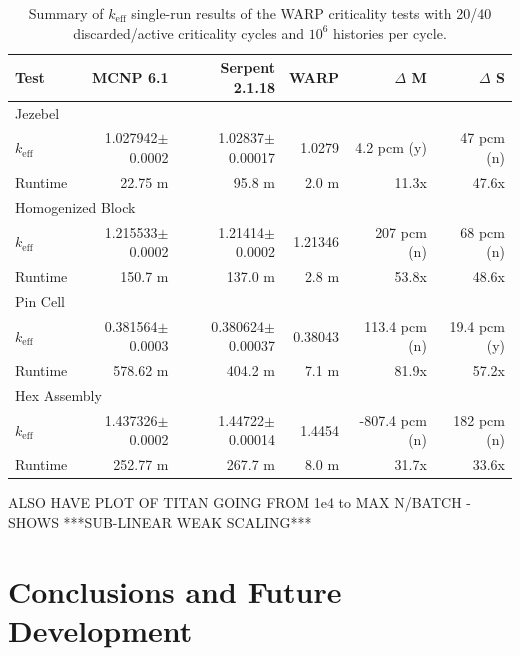 \documentclass[preprint,12pt]{elsarticle}
\begin{document}
\begin{table}[h]
\centering
\caption{Summary of $k_\mathrm{eff}$ single-run results of the WARP criticality tests with 20/40 discarded/active criticality cycles and $10^6$ histories per cycle.}
\label{test_summary_6}
\small
\begin{tabular}{| l | r | r | r | r | r |}
\hline
Test & MCNP 6.1 & Serpent 2.1.18 & WARP & $\Delta$ M & $\Delta$ S \\
\hline
\hline
\multicolumn{6}{|l|}{Jezebel} \\
\hline
$k_\mathrm{eff}$ & 1.027942$\pm$0.0002 & 1.02837$\pm$0.00017 & 1.0279 & 4.2 pcm (y) & 47 pcm (n) \\
\hline
Runtime & 22.75 m & 95.8 m & 2.0 m & 11.3x & 47.6x \\
\hline
\hline
\multicolumn{6}{|l|}{Homogenized Block }\\
\hline
$k_\mathrm{eff}$ & 1.215533$\pm$0.0002 & 1.21414$\pm$0.0002 & 1.21346 & 207 pcm (n) & 68 pcm (n) \\
\hline
Runtime & 150.7 m & 137.0 m & 2.8 m & 53.8x & 48.6x \\
\hline
\hline
\multicolumn{6}{|l|}{Pin Cell}\\
\hline
$k_\mathrm{eff}$ & 0.381564$\pm$0.0003 & 0.380624$\pm$0.00037 & 0.38043 & 113.4 pcm (n) & 19.4 pcm (y) \\
\hline
Runtime & 578.62 m & 404.2 m & 7.1 m & 81.9x & 57.2x \\
\hline
\hline
\multicolumn{6}{|l|}{Hex Assembly}\\
\hline
$k_\mathrm{eff}$ & 1.437326$\pm$0.0002 & 1.44722$\pm$0.00014 & 1.4454 & -807.4 pcm (n) & 182 pcm (n) \\
\hline
Runtime & 252.77 m & 267.7 m & 8.0 m & 31.7x & 33.6x \\
\hline
\end{tabular}
\end{table}


ALSO HAVE PLOT OF TITAN GOING FROM 1e4 to MAX N/BATCH - SHOWS ***SUB-LINEAR WEAK SCALING***

\section{Conclusions and Future Development}
\label{sec:conc}
\end{document}
